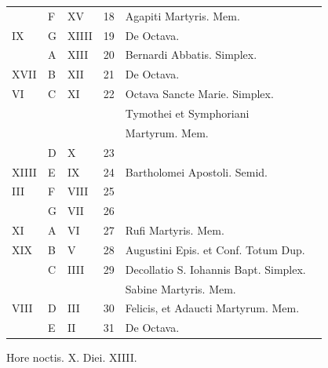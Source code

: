 \begin{center}
\begin{tabular}{l | l | l | r | l l}
\color{Red}  & F & \color{Red} XV & 18 & Agapiti Martyris. Mem. & \\
\color{Red} IX & G & \color{Red} XIIII & 19 & De Octava. & \color{Red} \\
\color{Red}  & \color{Red} A & \color{Red} XIII & 20 & Bernardi Abbatis. Simplex. & \color{Red} \\
\color{Red} XVII & B & \color{Red} XII & 21 & De Octava. & \color{Red} \\
\color{Red} VI & C & \color{Red} XI & 22 & \color{Red} Octava Sancte Marie. Simplex. \\
& & & & \multicolumn{2}{l}{\quad \color{Red} Tymothei et Symphoriani} \\
& & & & \multicolumn{2}{l}{\quad \color{Red} Martyrum. Mem.} \\
\color{Red}  & D & \color{Red} X & 23 & & \color{Red} \\
\color{Red} XIIII & E & \color{Red} IX & 24 & Bartholomei Apostoli. \color{Red} Semid. & \color{Red} \\
\color{Red} III & F & \color{Red} VIII & 25 &  & \color{Red} \\
\color{Red}  & G & \color{Red} VII & 26 &  & \color{Red} \\
\color{Red} XI & \color{Red} A & \color{Red} VI & 27 & \color{Red} Rufi Martyris. Mem. \\
\color{Red} XIX & B & \color{Red} V & 28 & \color{Red} Augustini Epis. et Conf. Totum Dup. & \color{Red} \\
\color{Red}  & C & \color{Red} IIII & 29 & \multicolumn{2}{l}{Decollatio S. Iohannis Bapt. Simplex.} \\
 &  & &  & \quad Sabine Martyris. Mem. \\
\color{Red} VIII & D & \color{Red} III & 30 & \color{Red} Felicis, et Adaucti Martyrum. Mem. \\
\color{Red}  & E & \color{Red} II & 31 & De Octava. \\
\end{tabular}
\color{Red} Hore noctis. X. Diei. XIIII.
\end{center}



\newpage
\color{Red}\color{black}

